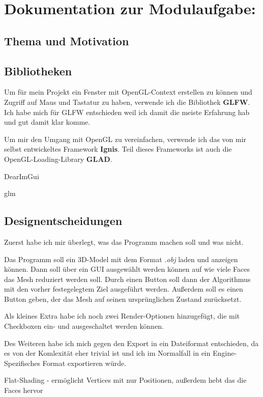 \documentclass[a4paper,12pt]{book}
\begin{document}
\chapter*{Dokumentation zur Modulaufgabe:}

\section*{Thema und Motivation}

\section*{Bibliotheken}

Um für mein Projekt ein Fenster mit OpenGL-Context erstellen zu können und Zugriff auf Maus und Tastatur zu haben, verwende ich die Bibliothek \textbf{GLFW}. Ich habe mich für GLFW entschieden weil ich damit die meiste Erfahrung hab und gut damit klar komme.

Um mir den Umgang mit OpenGL zu vereinfachen, verwende ich das von mir selbst entwickeltes Framework \textbf{Ignis}. Teil dieses Frameworks ist auch die OpenGL-Loading-Library \textbf{GLAD}.

DearImGui

glm

\section*{Designentscheidungen}

Zuerst habe ich mir überlegt, was das Programm machen soll und was nicht. 

Das Programm soll ein 3D-Model mit dem Format \emph{.obj} laden und anzeigen können. Dann soll über ein GUI ausgewählt werden können auf wie viele Faces das Mesh reduziert werden soll. Durch einen Button soll dann der Algorithmus mit den vorher festegelegtem Ziel ausgeführt werden. Außerdem soll es einen Button geben, der das Mesh auf seinen ursprünglichen Zustand zurücksetzt.

Als kleines Extra habe ich noch zwei Render-Optionen hinzugefügt, die mit Checkboxen ein- und ausgeschaltet werden können.

Des Weiteren habe ich mich gegen den Export in ein Dateiformat entschieden, da es von der Komlexität eher trivial ist und ich im Normalfall in ein Engine-Spezifisches Format exportieren würde.

Flat-Shading - ermöglicht Vertices mit nur Positionen, außerdem hebt das die Faces hervor
\end{document}
